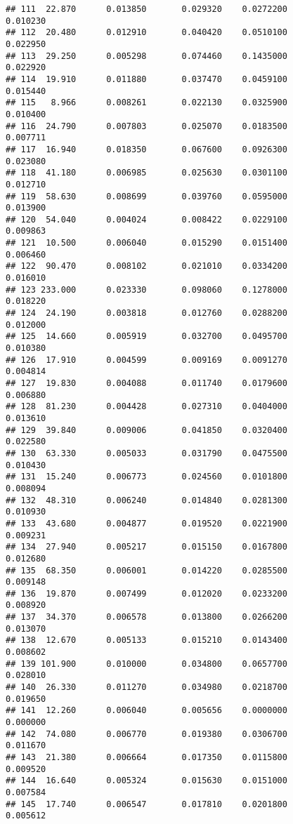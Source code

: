 \documentclass[
]{article}
\begin{document}
\begin{verbatim}
## 111  22.870      0.013850       0.029320    0.0272200          0.010230
## 112  20.480      0.012910       0.040420    0.0510100          0.022950
## 113  29.250      0.005298       0.074460    0.1435000          0.022920
## 114  19.910      0.011880       0.037470    0.0459100          0.015440
## 115   8.966      0.008261       0.022130    0.0325900          0.010400
## 116  24.790      0.007803       0.025070    0.0183500          0.007711
## 117  16.940      0.018350       0.067600    0.0926300          0.023080
## 118  41.180      0.006985       0.025630    0.0301100          0.012710
## 119  58.630      0.008699       0.039760    0.0595000          0.013900
## 120  54.040      0.004024       0.008422    0.0229100          0.009863
## 121  10.500      0.006040       0.015290    0.0151400          0.006460
## 122  90.470      0.008102       0.021010    0.0334200          0.016010
## 123 233.000      0.023330       0.098060    0.1278000          0.018220
## 124  24.190      0.003818       0.012760    0.0288200          0.012000
## 125  14.660      0.005919       0.032700    0.0495700          0.010380
## 126  17.910      0.004599       0.009169    0.0091270          0.004814
## 127  19.830      0.004088       0.011740    0.0179600          0.006880
## 128  81.230      0.004428       0.027310    0.0404000          0.013610
## 129  39.840      0.009006       0.041850    0.0320400          0.022580
## 130  63.330      0.005033       0.031790    0.0475500          0.010430
## 131  15.240      0.006773       0.024560    0.0101800          0.008094
## 132  48.310      0.006240       0.014840    0.0281300          0.010930
## 133  43.680      0.004877       0.019520    0.0221900          0.009231
## 134  27.940      0.005217       0.015150    0.0167800          0.012680
## 135  68.350      0.006001       0.014220    0.0285500          0.009148
## 136  19.870      0.007499       0.012020    0.0233200          0.008920
## 137  34.370      0.006578       0.013800    0.0266200          0.013070
## 138  12.670      0.005133       0.015210    0.0143400          0.008602
## 139 101.900      0.010000       0.034800    0.0657700          0.028010
## 140  26.330      0.011270       0.034980    0.0218700          0.019650
## 141  12.260      0.006040       0.005656    0.0000000          0.000000
## 142  74.080      0.006770       0.019380    0.0306700          0.011670
## 143  21.380      0.006664       0.017350    0.0115800          0.009520
## 144  16.640      0.005324       0.015630    0.0151000          0.007584
## 145  17.740      0.006547       0.017810    0.0201800          0.005612

\end{verbatim}
\end{document}
